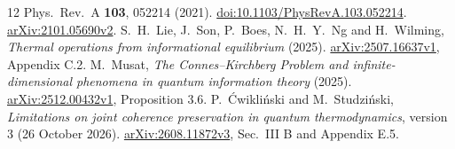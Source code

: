\documentclass[11pt]{article}
\begin{document}
\begin{thebibliography}{12}
Phys.\ Rev.\ A \textbf{103}, 052214 (2021).
\href{https://doi.org/10.1103/PhysRevA.103.052214}{doi:10.1103/PhysRevA.103.052214}.
\href{https://arxiv.org/abs/2101.05690v2}{arXiv:2101.05690v2}.
 S.\ H.\ Lie, J.\ Son, P.\ Boes, N.\ H.\ Y.\ Ng and H.\ Wilming,
\emph{Thermal operations from informational equilibrium} (2025).
\href{https://arxiv.org/abs/2507.16637v1}{arXiv:2507.16637v1}, Appendix C.2.
 M.\ Musat,
\emph{The Connes--Kirchberg Problem and infinite-dimensional phenomena in
quantum information theory} (2025).
\href{https://arxiv.org/abs/2512.00432v1}{arXiv:2512.00432v1}, Proposition 3.6.
 P.\ \'Cwikli\'nski and M.\ Studzi\'nski,
\emph{Limitations on joint coherence preservation in quantum thermodynamics},
version 3 (26 October 2026).
\href{https://arxiv.org/abs/2608.11872v3}{arXiv:2608.11872v3},
Sec.\ III B and Appendix E.5.
\end{thebibliography}
\end{document}
